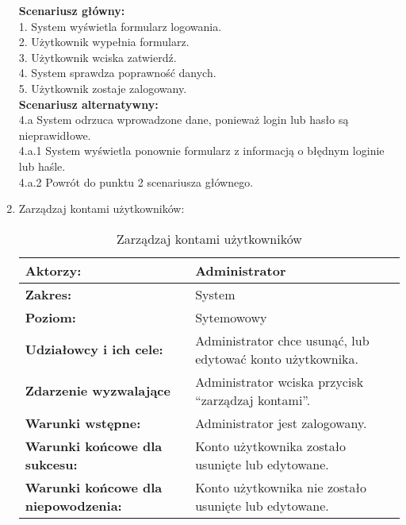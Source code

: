 \begin{enumerate}[label=(\Roman*)]
\textbf{Scenariusz główny:}\\
1. System wyświetla formularz logowania.\\
2. Użytkownik wypełnia formularz.\\
3. Użytkownik wciska zatwierdź.\\
4. System sprawdza poprawność danych.\\
5. Użytkownik zostaje zalogowany.\\
\textbf{Scenariusz alternatywny:}\\
4.a System odrzuca wprowadzone dane, ponieważ login lub hasło są nieprawidłowe.\\
4.a.1 System wyświetla ponownie formularz z informacją o błędnym loginie lub haśle.\\
4.a.2 Powrót do punktu 2 scenariusza głównego.\\

\item Zarządzaj kontami użytkowników:
	\begin{table}[H]
\centering
\caption{Zarządzaj kontami użytkowników}
\label{zku}
\begin{tabular}{|p{7cm}|p{7cm}|}
  \hline 
  \textbf{Aktorzy:} & Administrator\\
  \hline
  \textbf{Zakres:} & System \\
	\hline
  \textbf{Poziom:} & Sytemowowy \\
	\hline
  \textbf{Udziałowcy i ich cele: } & Administrator chce usunąć, lub edytować konto użytkownika.
 \\
	\hline
  \textbf{Zdarzenie wyzwalające } & Administrator wciska przycisk “zarządzaj kontami”.
\\
	\hline
  \textbf{Warunki wstępne: } & Administrator jest zalogowany. \\
	\hline
  \textbf{Warunki końcowe dla sukcesu:} & Konto użytkownika zostało usunięte lub edytowane.\\
	\hline
  \textbf{Warunki końcowe dla niepowodzenia:} &  Konto użytkownika nie zostało usunięte lub edytowane. \\
  \hline
\end{tabular} 
\end{table}


\end{enumerate}
